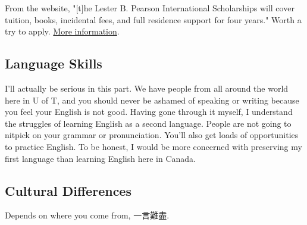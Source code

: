 From the website, "[t]he Lester B. Pearson International Scholarships will cover tuition, books, incidental fees, and full residence support for four years." Worth a try to apply. \href{https://future.utoronto.ca/pearson/about/}{More information}.

\subsection{Language Skills}

I'll actually be serious in this part. We have people from all around the world here in U of T, and you should never be ashamed of speaking or writing because you feel your English is not good. Having gone through it myself, I understand the struggles of learning English as a second language. People are not going to nitpick on your grammar or pronunciation. You'll also get loads of opportunities to practice English. To be honest, I would be more concerned with preserving my first language than learning English here in Canada.

\subsection{Cultural Differences}

Depends on where you come from, 一言難盡.
